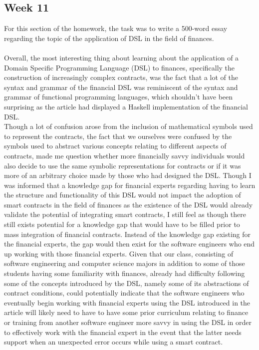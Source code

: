 \documentclass{article}
\theoremstyle{theorem}
\theoremstyle{definition}
\theoremstyle{remark}
\begin{document}
\subsection{Week 11}
For this section of the homework, the task was to write a 500-word essay regarding the topic of the application of DSL in the field of finances.
\\
\\
\indent Overall, the most interesting thing about learning about the application of a Domain Specific Programming Language (DSL) to finances, specifically the construction of increasingly complex contracts, was the fact that a lot of the syntax and grammar of the financial DSL was reminiscent of the syntax and grammar of functional programming languages, which shouldn’t have been surprising as the article had displayed a Haskell implementation of the financial DSL. \\

\indent Though a lot of confusion arose from the inclusion of mathematical symbols used to represent the contracts, the fact that we ourselves were confused by the symbols used to abstract various concepts relating to different aspects of contracts, made me question whether more financially savvy individuals would also decide to use the same symbolic representations for contracts or if it was more of an arbitrary choice made by those who had designed the DSL. Though I was informed that a knowledge gap for financial experts regarding having to learn the structure and functionality of this DSL would not impact the adoption of smart contracts in the field of finances as the existence of the DSL would already validate the potential of integrating smart contracts, I still feel as though there still exists potential for a knowledge gap that would have to be filled prior to mass integration of financial contracts. Instead of the knowledge gap existing for the financial experts, the gap would then exist for the software engineers who end up working with those financial experts. Given that our class, consisting of software engineering and computer science majors in addition to some of those students having some familiarity with finances, already had difficulty following some of the concepts introduced by the DSL, namely some of its abstractions of contract conditions, could potentially indicate that the software engineers who eventually begin working with financial experts using the DSL introduced in the article will likely need to have to have some prior curriculum relating to finance or training from another software engineer more savvy in using the DSL in order to effectively work with the financial expert in the event that the latter needs support when an unexpected error occurs while using a smart contract. \\
\end{document}
